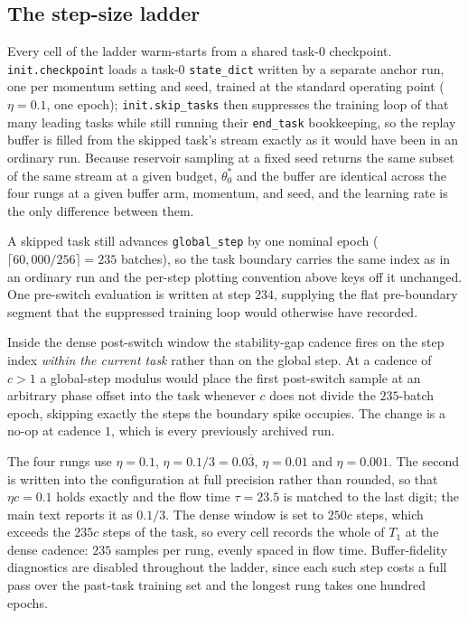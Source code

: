 \subsection{The step-size ladder}
\label{app:impl_ladder}

Every cell of the ladder warm-starts from a shared task-$0$ checkpoint. \texttt{init.checkpoint} loads a task-$0$ \texttt{state\_dict} written by a separate anchor run, one per momentum setting and seed, trained at the standard operating point ($\eta = 0.1$, one epoch); \texttt{init.skip\_tasks} then suppresses the training loop of that many leading tasks while still running their \texttt{end\_task} bookkeeping, so the replay buffer is filled from the skipped task's stream exactly as it would have been in an ordinary run. Because reservoir sampling at a fixed seed returns the same subset of the same stream at a given budget, $\theta_0^*$ and the buffer are identical across the four rungs at a given buffer arm, momentum, and seed, and the learning rate is the only difference between them.

A skipped task still advances \texttt{global\_step} by one nominal epoch ($\lceil 60{,}000 / 256 \rceil = 235$ batches), so the task boundary carries the same index as in an ordinary run and the per-step plotting convention above keys off it unchanged. One pre-switch evaluation is written at step $234$, supplying the flat pre-boundary segment that the suppressed training loop would otherwise have recorded.

Inside the dense post-switch window the stability-gap cadence fires on the step index \emph{within the current task} rather than on the global step. At a cadence of $c > 1$ a global-step modulus would place the first post-switch sample at an arbitrary phase offset into the task whenever $c$ does not divide the $235$-batch epoch, skipping exactly the steps the boundary spike occupies. The change is a no-op at cadence $1$, which is every previously archived run.

The four rungs use $\eta = 0.1$, $\eta = 0.1/3 = 0.0\overline{3}$, $\eta = 0.01$ and $\eta = 0.001$. The second is written into the configuration at full precision rather than rounded, so that $\eta c = 0.1$ holds exactly and the flow time $\tau = 23.5$ is matched to the last digit; the main text reports it as $0.1/3$. The dense window is set to $250c$ steps, which exceeds the $235c$ steps of the task, so every cell records the whole of $T_1$ at the dense cadence: $235$ samples per rung, evenly spaced in flow time. Buffer-fidelity diagnostics are disabled throughout the ladder, since each such step costs a full pass over the past-task training set and the longest rung takes one hundred epochs.

